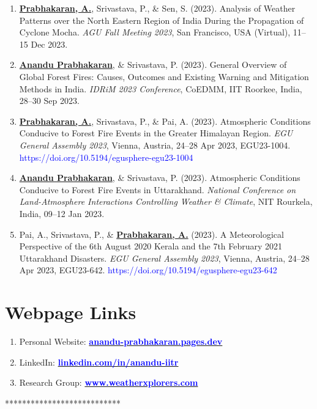 \documentclass[letterpaper,11pt]{article}
\begin{document}
\begin{justify}
\begin{enumerate}[leftmargin=*]
    \item \underline{\textbf{Prabhakaran, A.}}, Srivastava, P., \& Sen, S. (2023). Analysis of Weather Patterns over the North Eastern Region of India During the Propagation of Cyclone Mocha. \textit{AGU Fall Meeting 2023}, San Francisco, USA (Virtual), 11--15 Dec 2023.
    \vspace{0.12cm}

    \item \underline{\textbf{Anandu Prabhakaran}}, \& Srivastava, P. (2023). General Overview of Global Forest Fires: Causes, Outcomes and Existing Warning and Mitigation Methods in India. \textit{IDRiM 2023 Conference}, CoEDMM, IIT Roorkee, India, 28--30 Sep 2023.
    \vspace{0.12cm}

    \item \underline{\textbf{Prabhakaran, A.}}, Srivastava, P., \& Pai, A. (2023). Atmospheric Conditions Conducive to Forest Fire Events in the Greater Himalayan Region. \textit{EGU General Assembly 2023}, Vienna, Austria, 24--28 Apr 2023, EGU23-1004. \textcolor{blue}{https://doi.org/10.5194/egusphere-egu23-1004}
    \vspace{0.12cm}

    \item \underline{\textbf{Anandu Prabhakaran}}, \& Srivastava, P. (2023). Atmospheric Conditions Conducive to Forest Fire Events in Uttarakhand. \textit{National Conference on Land-Atmosphere Interactions Controlling Weather \& Climate}, NIT Rourkela, India, 09--12 Jan 2023.
    \vspace{0.12cm}

    \item Pai, A., Srivastava, P., \& \underline{\textbf{Prabhakaran, A.}} (2023). A Meteorological Perspective of the 6th August 2020 Kerala and the 7th February 2021 Uttarakhand Disasters. \textit{EGU General Assembly 2023}, Vienna, Austria, 24--28 Apr 2023, EGU23-642. \textcolor{blue}{https://doi.org/10.5194/egusphere-egu23-642}
    \vspace{0.12cm}

\end{enumerate}
\end{justify}
\vspace{-0.15cm}

\section{Webpage Links}
\begin{enumerate}[leftmargin=*]
    \item Personal Website: \href{https://anandu-prabhakaran.pages.dev/}{\textcolor{blue}{\textbf{anandu-prabhakaran.pages.dev}}}
    \item LinkedIn: \href{https://www.linkedin.com/in/anandu-iitr}{\textcolor{blue}{\textbf{linkedin.com/in/anandu-iitr}}}
    \item Research Group: \href{https://www.weatherxplorers.com}{\textcolor{blue}{\textbf{www.weatherxplorers.com}}}
\end{enumerate}

\begin{center}
    ***************************
\end{center}
\end{document}

